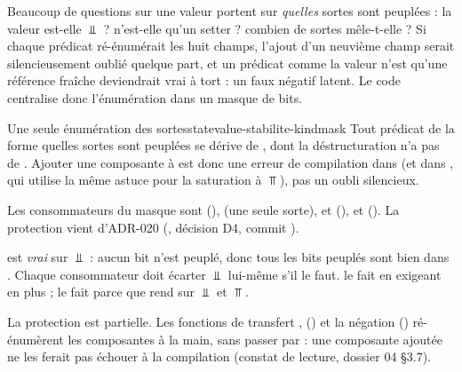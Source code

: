 Beaucoup de questions sur une valeur portent sur \emph{quelles} sortes sont
peuplées : la valeur est-elle $\Bot$ ? n'est-elle qu'un setter ? combien de
sortes mêle-t-elle ? Si chaque prédicat ré-énumérait les huit champs,
l'ajout d'un neuvième champ serait silencieusement oublié quelque part, et
un prédicat comme \og la valeur n'est qu'une référence fraîche\fg{}
deviendrait vrai à tort : un faux négatif latent. Le code centralise donc
l'énumération dans un masque de bits.



\begin{invariant}{Une seule énumération des sortes}{statevalue-stabilite-kindmask}
  Tout prédicat de la forme \og quelles sortes sont peuplées\fg{} se dérive
  de , dont la déstructuration n'a pas de .
  Ajouter une composante à  est donc une erreur de
  compilation dans  (et dans , qui
  utilise la même astuce pour la saturation à $\Top$), pas un oubli
  silencieux.
\end{invariant}

Les consommateurs du masque sont  (),
 (une seule sorte),  et
 (), et 
(). La protection vient d'ADR-020 (, décision D4,
commit ).


\begin{piege}
   est \emph{vrai} sur $\Bot$ : aucun bit n'est peuplé, donc
  tous les bits peuplés sont bien dans . Chaque consommateur
  doit écarter $\Bot$ lui-même s'il le faut. 
  le fait en exigeant en plus  ;
   le fait parce que  rend
   sur $\Bot$ et $\Top$.
\end{piege}

\begin{piege}
  La protection est partielle. Les fonctions de transfert ,
   ()
  et la négation \code{!} () ré-énumèrent les
  composantes à la main, sans passer par  : une composante
  ajoutée ne les ferait pas échouer à la compilation (constat de lecture,
  dossier 04 §3.7).
\end{piege}

